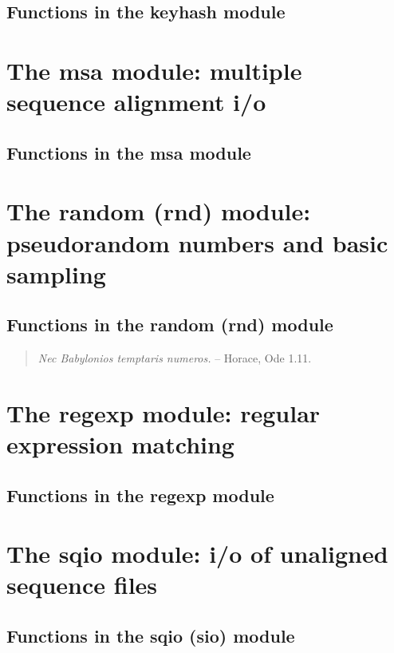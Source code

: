\documentclass[11pt]{book}
\begin{document}
\subsection{Functions in the keyhash module}


\newpage
\section{The msa module: multiple sequence alignment i/o}

\subsection{Functions in the msa module}


\newpage
\section{The random (rnd) module: pseudorandom numbers and basic sampling}

\subsection{Functions in the random (rnd) module}

\vspace*{\fill}

\begin{quote}
\emph{Nec Babylonios temptaris numeros.} \hspace{3em} -- Horace, Ode
1.11. \\ 
\end{quote}     

\newpage
\section{The regexp module: regular expression matching}

\subsection{Functions in the regexp module}


\newpage
\section{The sqio module: i/o of unaligned sequence files}

\subsection{Functions in the sqio (sio) module}

\end{document}
